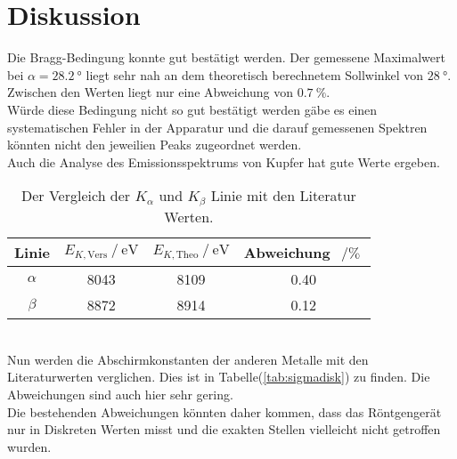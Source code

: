 \section{Diskussion}

    \noindent Die Bragg-Bedingung konnte gut bestätigt werden. Der gemessene Maximalwert bei $\alpha = \SI{28.2}{\degree}$ liegt sehr nah an dem 
    theoretisch berechnetem Sollwinkel von $\SI{28}{\degree}$. Zwischen den Werten liegt nur eine Abweichung von $\SI{0.7}{\percent}$. \\
    Würde diese Bedingung nicht so gut bestätigt werden gäbe es einen systematischen Fehler in der Apparatur und die darauf gemessenen Spektren 
    könnten nicht den jeweilien Peaks zugeordnet werden.\\

    \noindent Auch die Analyse des Emissionsspektrums von Kupfer hat gute Werte ergeben.
    \begin{table}
        \centering
        \caption{Der Vergleich der $K_{\alpha}$ und $K_{\beta}$ Linie mit den Literatur Werten.}
        \begin{tabular}{c c c c}
            \toprule
            Linie & $E_{K , \text{Vers}} \mathbin{/} \si{\electronvolt}$ & $ E_{K , \text{Theo}} \mathbin{/} \si{\electronvolt}$ & Abweichung $ \, \mathbin{/} \si{\percent}$\\
            \midrule
            $\alpha$ & 8043 & 8109 & 0.40\\
            $\beta$  & 8872 & 8914 & 0.12\\
            \bottomrule
        \end{tabular}
    \end{table}\\

    \noindent Nun werden die Abschirmkonstanten der anderen Metalle mit den Literaturwerten verglichen. Dies ist in Tabelle(\ref{tab:sigmadisk}) 
    zu finden. Die Abweichungen sind auch hier sehr gering.\\ Die bestehenden Abweichungen könnten daher kommen, dass das 
    Röntgengerät nur in Diskreten Werten misst und die exakten Stellen vielleicht nicht getroffen wurden.

